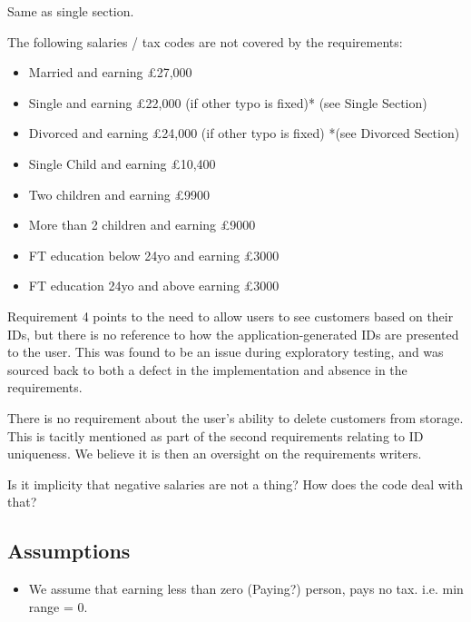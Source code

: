 Same as single section. 

The following salaries / tax codes are not covered by the requirements: 
\begin{itemize}
	\item Married and earning £27,000
	\item Single and earning £22,000 (if other typo is fixed)* (see Single Section)
	\item Divorced and earning £24,000 (if other typo is fixed) *(see Divorced Section)
	\item Single Child and earning £10,400
	\item Two children and earning £9900
	\item More than 2 children and earning £9000
	\item FT education below 24yo and earning £3000
	\item FT education 24yo and above earning £3000
\end{itemize}


Requirement 4 points to the need to allow users to see customers based on their IDs, but there is no reference to how the application-generated IDs are presented to the user. This was found to be an issue during exploratory testing, and was sourced back to both a defect in the implementation and absence in the requirements. 

There is no requirement about the user's ability to delete customers from storage. This is tacitly mentioned as part of the second requirements relating to ID uniqueness. We believe it is then an oversight on the requirements writers. 

Is it implicity that negative salaries are not a thing? How does the code deal with that? 

\subsection{Assumptions}


\begin{itemize}
	\item We assume that earning less than zero (Paying?) person, pays no tax. i.e. min range = 0. 
\end{itemize}

